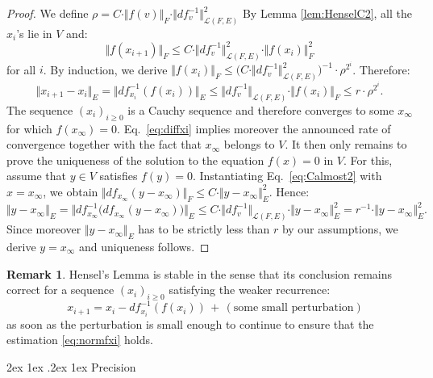 \documentclass[11pt]{article}
\makeatletter
\numberwithin{equation}{section}
\numberwithin{figure}{section}
\renewcommand\paragraph{\@startsection{paragraph}{4}{\z@}%
                                    {2ex \@plus1ex \@minus.2ex}%
                                    {1ex}%
                                    {\normalfont\normalsize\bfseries}}
\renewcommand{\leq}{\leqslant}
\renewcommand{\geq}{\geqslant}
\theoremstyle{definition}
\newtheorem{rem}[theo]{Remark}
\newcommand{\calL}{\mathcal L}
\makeatother
\begin{document}
\begin{proof}
We define $\rho = C \cdot 
\Vert f(v) \Vert_F \cdot \Vert df_v^{-1} \Vert_{\calL(F,E)}^2$
By Lemma \eqref{lem:HenselC2}, all the $x_i$'s lie in $V$ and:
\begin{equation}
\label{eq:normfxi}
\Vert f(x_{i+1}) \Vert_F \leq 
C \cdot \Vert df_v^{-1} \Vert_{\calL(F,E)}^2 \cdot \Vert f(x_i) \Vert_F^2
\end{equation}
for all $i$. By induction, we derive $\Vert f(x_i) \Vert_F \leq
\big(C \cdot \Vert df_v^{-1} \Vert_{\calL(F,E)}^2\big)^{-1} 
\cdot \rho^{2^i}$. Therefore:
\begin{equation}
\label{eq:diffxi}
\Vert x_{i+1} - x_i \Vert_E =
\Vert df_{x_i}^{-1}(f(x_i)) \Vert_E \leq
\Vert df_v^{-1} \Vert_{\calL(F,E)} \cdot \Vert f(x_i) \Vert_F \leq
r \cdot \rho^{2^i}.
\end{equation}
The sequence $(x_i)_{i \geq 0}$ is a Cauchy sequence and therefore 
converges to some $x_\infty$ for which $f(x_\infty) = 0$.
Eq.~\eqref{eq:diffxi} implies moreover the announced rate of convergence 
together with the fact that $x_\infty$ belongs to $V$.
It then only remains to prove the uniqueness of the solution to the 
equation $f(x) = 0$ in $V$. For 
this, assume that $y \in V$ satisfies $f(y) = 0$. 
Instantiating Eq.~\eqref{eq:Calmost2} with $x = x_\infty$, we obtain
$\Vert df_{x_\infty}(y{-}x_\infty) \Vert_F \leq C \cdot 
\Vert y{-}x_\infty \Vert_E^2$. Hence:
$$\Vert y{-}x_\infty \Vert_E 
= \Vert df_{x_\infty}^{-1}\big(df_{x_\infty}(y{-}x_\infty)\big) \Vert_E 
\leq C \cdot \Vert df_v^{-1} \Vert_{\calL(F,E)} \cdot
  \Vert y{-}x_\infty \Vert_E^2 
= r^{-1} \cdot \Vert y{-}x_\infty \Vert_E^2.$$
Since moreover $\Vert y - x_\infty \Vert_E$ has to be strictly less
than $r$ by our assumptions, we derive $y = x_\infty$ and uniqueness
follows.
\end{proof}

\begin{rem}
\label{rem:HenselC2}
Hensel's Lemma is stable in the sense that its conclusion remains
correct for a sequence $(x_i)_{i \geq 0}$ satisfying the weaker
recurrence:
$$\quad x_{i+1} = x_i - df_{x_i}^{-1}(f(x_i))\, +\, (\text{some
 small perturbation})$$
as soon as the perturbation is small enough to continue to ensure 
that the estimation \eqref{eq:normfxi} holds.
\end{rem}

\paragraph{Precision}
\end{document}
